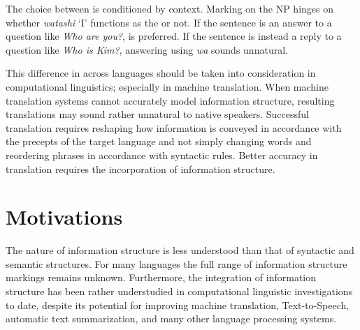 

\noindent The choice between  is conditioned by
context. Marking on the NP hinges on whether \textit{watashi} `I'
functions as the  or not. If the sentence is an answer to a
question like \textit{Who are you?}, \wa is preferred. If the sentence
is instead a reply to a question like \textit{Who is Kim?}, answering
using \textit{wa} sounds unnatural.


This difference in  across languages should
be taken into consideration in computational linguistics; especially
in machine translation.  When machine translation systems cannot
accurately model information structure, resulting translations may
sound rather unnatural to native speakers.  Successful translation
requires reshaping how information is conveyed in accordance with the
precepts of the target language and not simply changing words and
reordering phrases in accordance with syntactic rules. Better accuracy
in translation requires the incorporation of information structure.




\section{Motivations}
\label{1:sec:motivations}


The nature of information structure is less understood than that of
syntactic and semantic structures. For many languages the full range
of information structure markings remains unknown. Furthermore, the
integration of information structure has been rather understudied in
computational linguistic investigations to date, despite its potential
for improving machine translation, Text-to-Speech, automatic text
summarization, and many other language processing systems.



